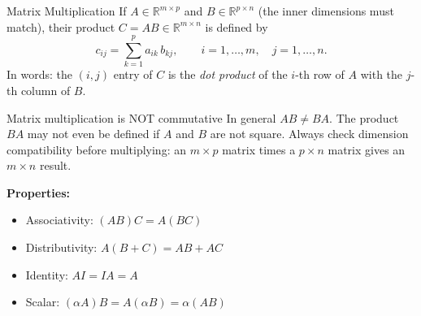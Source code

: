 \begin{defnbox}{Matrix Multiplication}
	If $A \in \mathbb{R}^{m \times p}$ and $B \in \mathbb{R}^{p \times n}$
	(the inner dimensions must match), their product
	$C = AB \in \mathbb{R}^{m \times n}$ is defined by
	\[
	c_{ij} = \sum_{k=1}^{p} a_{ik}\, b_{kj},
	\qquad i = 1,\ldots,m,\quad j = 1,\ldots,n.
	\]
	In words: the $(i,j)$ entry of $C$ is the \emph{dot product} of the
	$i$-th row of $A$ with the $j$-th column of $B$.
\end{defnbox}

\begin{alertbox}{Matrix multiplication is NOT commutative}
	In general $AB \neq BA$.  The product $BA$ may not even be defined if
	$A$ and $B$ are not square.  Always check dimension compatibility
	before multiplying: an $m\times p$ matrix times a $p \times n$ matrix
	gives an $m \times n$ result.
\end{alertbox}

\textbf{Properties:}
\begin{itemize}[noitemsep]
	\item Associativity: $(AB)C = A(BC)$
	\item Distributivity: $A(B+C) = AB + AC$
	\item Identity: $AI = IA = A$
	\item Scalar: $(\alpha A)B = A(\alpha B) = \alpha(AB)$
\end{itemize}

